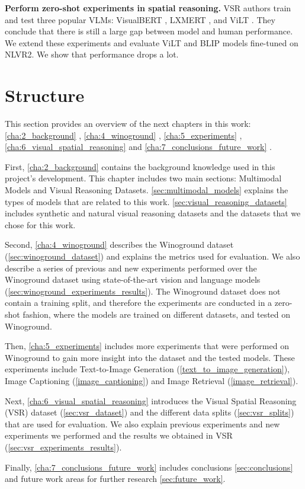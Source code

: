 \textbf{Perform zero-shot experiments in spatial reasoning.} VSR authors \cite{liu2022visual} train and test three popular VLMs: VisualBERT \cite{li2019visualbert}, LXMERT \cite{tan2020lxmert}, and
ViLT \cite{kim2021vilt}. They conclude that there is still a large gap between model and human performance. We extend these experiments and evaluate ViLT \cite{kim2021vilt} and BLIP \cite{li2022blip} models fine-tuned on NLVR2. We show that performance drops a lot.

\section{Structure}

This section provides an overview of the next chapters in this work: \ref{cha:2_background} , \ref{cha:4_winoground} , \ref{cha:5_experiments} , \ref{cha:6_visual_spatial_reasoning}  and \ref{cha:7_conclusions_future_work} .

First, \cref{cha:2_background} contains the background knowledge used in this project's development. This chapter includes two main sections: Multimodal Models and Visual Reasoning Datasets. \cref{sec:multimodal_models} explains the types of models that are related to this work. \cref{sec:visual_reasoning_datasets} includes synthetic and natural visual reasoning datasets and the datasets that we chose for this work.

Second, \cref{cha:4_winoground} describes the Winoground \cite{thrush2022winoground} dataset (\cref{sec:winoground_dataset}) and explains the metrics used for evaluation. We also describe a series of previous and new experiments performed over the Winoground dataset using state-of-the-art vision and language models (\cref{sec:winoground_experiments_results}). The Winoground dataset does not contain a training split, and therefore the experiments are conducted in a zero-shot fashion, where the models are trained on different datasets, and tested on Winoground.

Then, \cref{cha:5_experiments} includes more experiments that were performed on Winoground to gain more insight into the dataset and the tested models. These experiments include Text-to-Image Generation (\ref{text_to_image_generation}), Image Captioning (\ref{image_captioning}) and Image Retrieval (\ref{image_retrieval}).

Next, \cref{cha:6_visual_spatial_reasoning} introduces the Visual Spatial Reasoning (VSR) \cite{liu2022visual} dataset (\cref{sec:vsr_dataset}) and the different data splits (\cref{sec:vsr_splits}) that are used for evaluation. We also explain previous experiments and new experiments we performed and the results we obtained in VSR (\cref{sec:vsr_experiments_results}).

Finally, \cref{cha:7_conclusions_future_work} includes conclusions \cref{sec:conclusions} and future work areas for further research \cref{sec:future_work}.